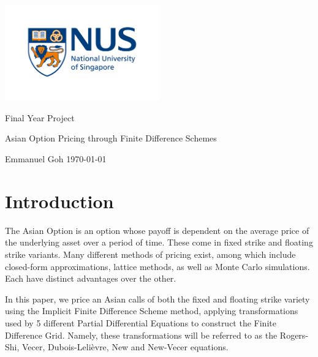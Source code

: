 \documentclass{article}
\begin{document}
\begin{titlepage}
  \centering
  \includegraphics[width=0.5\textwidth]{nus}

  \LARGE Final Year Project

  \vspace{1cm}
  \Large Asian Option Pricing through Finite Difference Schemes

  \vspace{1cm}

  \Large Emmanuel Goh
  \vfill
  \large \today
\end{titlepage}

\tableofcontents

\newpage

\section{Introduction}

The Asian Option is an option whose payoff is dependent on the average price of the underlying asset over a period of time. These come in fixed strike and floating strike variants. Many different methods of pricing exist, among which include closed-form approximations, lattice methods, as well as Monte Carlo simulations. Each have distinct advantages over the other.

In this paper, we price an Asian calls of both the fixed and floating strike variety using the Implicit Finite Difference Scheme method, applying transformations used by 5 different Partial Differential Equations to construct the Finite Difference Grid. Namely, these transformations will be referred to as the Rogers-Shi, Vecer, Dubois-Leli\`evre, New and New-Vecer equations.
\end{document}
